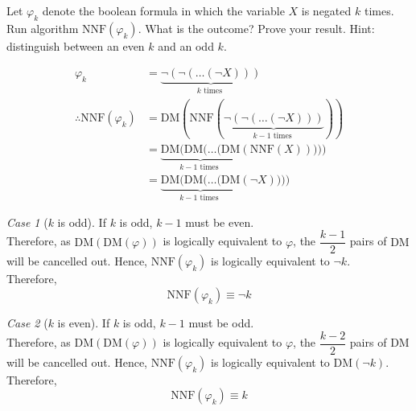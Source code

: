 \documentclass[fleqn, a4paper, 12pt, oneside]{amsart}
\theoremstyle{definition}
\theoremstyle{theorem}
\theoremstyle{remark}
\newtheorem{case}{Case}
\newcommand{\NOT}{\neg}
\begin{document}
\begin{question}
	Let $\varphi_k$ denote the boolean formula in which the variable $X$ is negated $k$ times. Run algorithm $\mathrm{NNF}(\varphi_k)$.
	What is the outcome?
	Prove your result.
	Hint: distinguish between an even $k$ and an odd $k$.
\end{question}

\begin{solution}
	\begin{align*}
		\varphi_k &= \underbrace{\NOT(\NOT(\dots(\NOT X)))}_{k \text{ times }}\\
		\therefore \mathrm{NNF}(\varphi_k) &= \mathrm{DM}(\mathrm{NNF}(\underbrace{\NOT(\NOT(\dots(\NOT X)))}_{k - 1 \text{ times }}))\\
		&= \underbrace{\mathrm{DM}(\mathrm{DM}(\dots(\mathrm{DM}}_{k - 1 \text{ times }}(\mathrm{NNF}(X)))))\\
		&= \underbrace{\mathrm{DM}(\mathrm{DM}(\dots(\mathrm{DM}}_{k - 1 \text{ times }}(\NOT X))))
	\end{align*}
	\begin{case}[$k$ is odd]
		If $k$ is odd, $k - 1$ must be even.\\
		Therefore, as $\mathrm{DM}(\mathrm{DM}(\varphi))$ is logically equivalent to $\varphi$, the $\dfrac{k - 1}{2}$ pairs of $\mathrm{DM}$ will be cancelled out.
		Hence, $\mathrm{NNF}(\varphi_k)$ is logically equivalent to $\NOT k$.\\
		Therefore,
		\begin{equation*}
			\mathrm{NNF}(\varphi_k) \equiv \NOT k
		\end{equation*}
	\end{case}
	\begin{case}[$k$ is even]
		If $k$ is odd, $k - 1$ must be odd.\\
		Therefore, as $\mathrm{DM}(\mathrm{DM}(\varphi))$ is logically equivalent to $\varphi$, the $\dfrac{k - 2}{2}$ pairs of $\mathrm{DM}$ will be cancelled out.
		Hence, $\mathrm{NNF}(\varphi_k)$ is logically equivalent to $\mathrm{DM}(\NOT k)$.\\
		Therefore,
		\begin{equation*}
			\mathrm{NNF}(\varphi_k) \equiv k
		\end{equation*}
	\end{case}
\end{solution}
\end{document}
